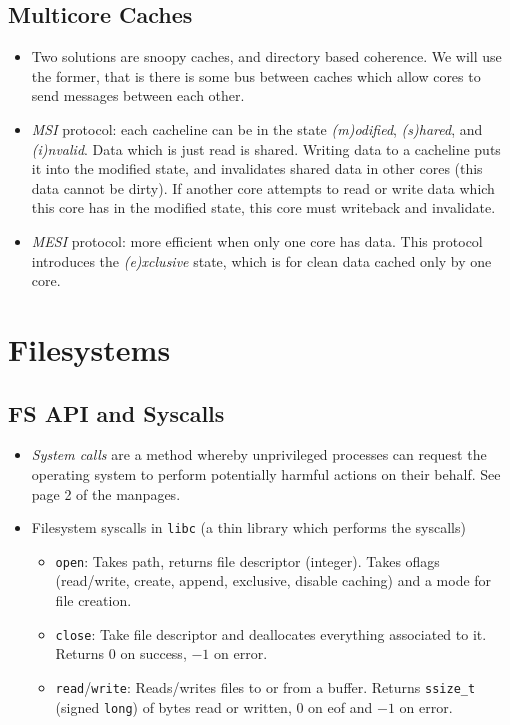 \documentclass[12pt]{article}
\begin{document}
\subsection{Multicore Caches}
\begin{itemize}
	\item Two solutions are snoopy caches, and directory based coherence. We will use the former, that is there is some bus between caches which allow cores to send messages between each other. 
	\item \textit{MSI} protocol: each cacheline can be in the state \textit{(m)odified}, \textit{(s)hared}, and \textit{(i)nvalid}. Data which is just read is shared. Writing data to a cacheline puts it into the modified state, and invalidates shared data in other cores (this data cannot be dirty). If another core attempts to read or write data which this core has in the modified state, this core must writeback and invalidate. 
	\item \textit{MESI} protocol: more efficient when only one core has data. This protocol introduces the \textit{(e)xclusive} state, which is for clean data cached only by one core. 
\end{itemize}

\newpage
\section{Filesystems}
\subsection{FS API and Syscalls}
\begin{itemize}
	\item \textit{System calls} are a method whereby unprivileged processes can request the operating system to perform potentially harmful actions on their behalf. See page 2 of the manpages. 
	\item Filesystem syscalls in \texttt{libc} (a thin library which performs the syscalls)
		\begin{itemize}
			\item \texttt{open}: Takes path, returns file descriptor (integer). Takes oflags (read/write, create, append, exclusive, disable caching) and a mode for file creation. 
			\item \texttt{close}: Take file descriptor and deallocates everything associated to it. Returns 0 on success, $-1$ on error.  
			\item \texttt{read}/\texttt{write}: Reads/writes files to or from a buffer. Returns \texttt{ssize\_t} (signed \texttt{long}) of bytes read or written, 0 on eof and $-1$ on error. 
		\end{itemize}
\end{itemize}
\end{document}
